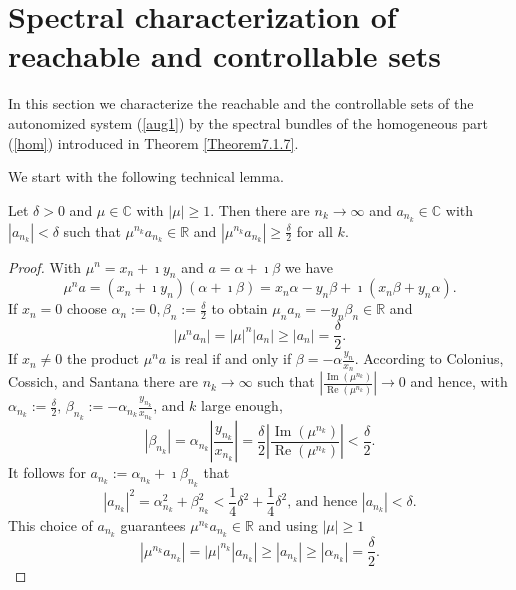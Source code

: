 \documentclass{siamltex}%
\begin{document}
\section{Spectral characterization of reachable and controllable
sets\label{Section4}}

In this section we characterize the reachable and the controllable sets of the
autonomized system (\ref{aug1}) by the spectral bundles of the homogeneous
part (\ref{hom}) introduced in Theorem \ref{Theorem7.1.7}.

We start with the following technical lemma.

\begin{lemma}
\label{Lemma_complex}Let $\delta>0$ and $\mu\in\mathbb{C}$ with $\left\vert
\mu\right\vert \geq1$. Then there are $n_{k}\rightarrow\infty$ and $a_{n_{k}%
}\in\mathbb{C}$ with $\left\vert a_{n_{k}}\right\vert <\delta$ such that
$\mu^{n_{k}}a_{n_{k}}\in\mathbb{R}$ and $\left\vert \mu^{n_{k}}a_{n_{k}%
}\right\vert \geq\frac{\delta}{2}$ for all $k$.
\end{lemma}

\begin{proof}
With $\mu^{n}=x_{n}+\imath y_{n}$ and $a=\alpha+\imath\beta$ we have%
\[
\mu^{n}a=(x_{n}+\imath y_{n})(\alpha+\imath\beta)=x_{n}\alpha-y_{n}%
\beta+\imath(x_{n}\beta+y_{n}\alpha).
\]
If $x_{n}=0$ choose $\alpha_{n}:=0,\beta_{n}:=\frac{\delta}{2}$ to obtain
$\mu_{n}a_{n}=-y_{n}\beta_{n}\in\mathbb{R}$ and%
\[
\left\vert \mu^{n}a_{n}\right\vert =\left\vert \mu\right\vert ^{n}\left\vert
a_{n}\right\vert \geq\left\vert a_{n}\right\vert =\frac{\delta}{2}.
\]
If $x_{n}\not =0$ the product $\mu^{n}a$ is real if and only if $\beta
=-\alpha\frac{y_{n}}{x_{n}}$. According to Colonius, Cossich, and Santana
\cite[Lemma 13]{ColCS22} there are $n_{k}\rightarrow\infty$ such that
$\left\vert \frac{\operatorname{Im}(\mu^{n_{k}})}{\operatorname{Re}(\mu
^{n_{k}})}\right\vert \rightarrow0$ and hence, with $\alpha_{n_{k}}%
:=\frac{\delta}{2},\,\beta_{n_{k}}:=-\alpha_{n_{k}}\frac{y_{n_{k}}}{x_{n_{k}}%
}$, and $k$ large enough,%
\[
\left\vert \beta_{n_{k}}\right\vert =\alpha_{n_{k}}\left\vert \frac{y_{n_{k}}%
}{x_{n_{k}}}\right\vert =\frac{\delta}{2}\left\vert \frac{\operatorname{Im}%
(\mu^{n_{k}})}{\operatorname{Re}(\mu^{n_{k}})}\right\vert <\frac{\delta}{2}.
\]
It follows for $a_{n_{k}}:=\alpha_{n_{k}}+\imath\beta_{n_{k}}$ that%
\[
\left\vert a_{n_{k}}\right\vert ^{2}=\alpha_{n_{k}}^{2}+\beta_{n_{k}}%
^{2}<\frac{1}{4}\delta^{2}+\frac{1}{4}\delta^{2}\text{, and hence }\left\vert
a_{n_{k}}\right\vert <\delta.
\]
This choice of $a_{n_{k}}$ guarantees $\mu^{n_{k}}a_{n_{k}}\in\mathbb{R}$ and
using $\left\vert \mu\right\vert \geq1$%
\[
\left\vert \mu^{n_{k}}a_{n_{k}}\right\vert =\left\vert \mu\right\vert ^{n_{k}%
}\left\vert a_{n_{k}}\right\vert \geq\left\vert a_{n_{k}}\right\vert
\geq\left\vert \alpha_{n_{k}}\right\vert =\frac{\delta}{2}.
\]

\end{proof}
\end{document}
